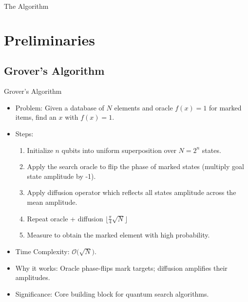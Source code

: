 \documentclass{beamer}
\begin{document}
\begin{frame}{The Algorithm}
\begin{figure}
{%
    }
    \label{fig:quantum-string-matching-alg}
  \end{figure}
\end{frame}

\section{Preliminaries}

\subsection{Grover's Algorithm}
\begin{frame}{Grover's Algorithm}
  \begin{itemize}
    \item Problem: Given a database of \(N\) elements and oracle \(f(x)=1\) for marked items, find an \(x\) with \(f(x)=1\).
    \item Steps:
          \begin{enumerate}
            \item Initialize \(n\) qubits into uniform superposition over \(N=2^n\) states.
            \item Apply the search oracle to flip the phase of marked states (multiply goal state amplitude by -1).
            \item Apply diffusion operator which reflects all states amplitude across the mean amplitude.
            \item Repeat oracle + diffusion \(\bigl\lfloor\frac{\pi}{4}\sqrt{N}\bigr\rfloor\)
            \item Measure to obtain the marked element with high probability.
          \end{enumerate}
    \item Time Complexity: \(\mathcal{O}\!\bigl(\sqrt{N}\bigr)\).
    \item Why it works: Oracle phase-flips mark targets; diffusion amplifies their amplitudes.
    \item Significance: Core building block for quantum search algorithms.
  \end{itemize}
\end{frame}
\end{document}
